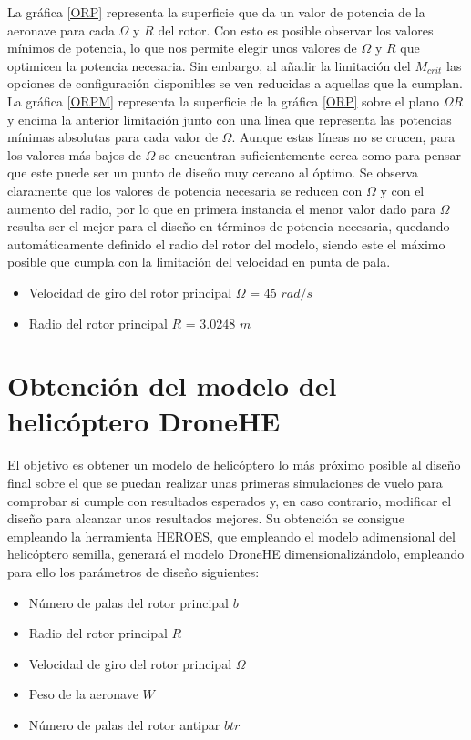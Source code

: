 La gráfica \ref{ORP} representa la superficie que da un valor de potencia de la aeronave para cada $\Omega$ y $R$ del rotor. Con esto es posible observar los valores mínimos de potencia, lo que nos permite elegir unos valores de $\Omega$ y $R$ que optimicen la potencia necesaria.
Sin embargo, al añadir la limitación del $M_{crit}$ las opciones de configuración disponibles se ven reducidas a aquellas que la cumplan. La gráfica \ref{ORPM} representa la superficie de la gráfica \ref{ORP} sobre el plano $\Omega R$ y encima la anterior limitación junto con una línea que representa las potencias mínimas absolutas para cada valor de $\Omega$. Aunque estas líneas no se crucen, para los valores más bajos de $\Omega$ se encuentran suficientemente cerca como para pensar que este puede ser un punto de diseño muy cercano al óptimo.
Se observa claramente que los valores de potencia necesaria se reducen con $\Omega$ y con el aumento del radio, por lo que en primera instancia el menor valor dado para $\Omega$ resulta ser el mejor para el diseño en términos de potencia necesaria, quedando automáticamente definido el radio del rotor del modelo, siendo este el máximo posible que cumpla con la limitación del velocidad en punta de pala.

\begin{itemize}
	\item Velocidad de giro del rotor principal $\Omega$ = 45 $rad/s$
	\item Radio del rotor principal $R$ = 3.0248 $m$
\end{itemize}

\section{Obtención del modelo del helicóptero DroneHE}

El objetivo es obtener un modelo de helicóptero lo más próximo posible al diseño final sobre el que se puedan realizar unas primeras simulaciones de vuelo para comprobar si cumple con resultados esperados y, en caso contrario, modificar el diseño para alcanzar unos resultados mejores. Su obtención se consigue empleando la herramienta HEROES, que empleando el modelo adimensional del helicóptero semilla, generará el modelo DroneHE dimensionalizándolo, empleando para ello los parámetros de diseño siguientes: 

\begin{itemize}
	\item Número de palas del rotor principal $b$
	\item Radio del rotor principal $R$
	\item Velocidad de giro del rotor principal $\Omega$
	\item Peso de la aeronave $W$
	\item Número de palas del rotor antipar $btr$
\end{itemize}

